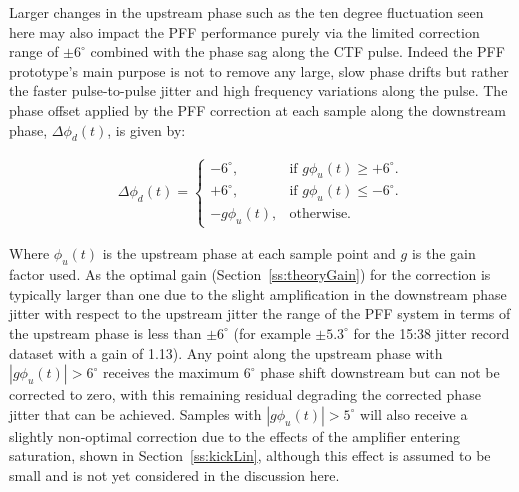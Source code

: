 Larger changes in the upstream phase such as the ten degree fluctuation seen here may 
also impact the PFF performance purely via the limited correction range of 
\(\pm6^\circ\) combined with the phase sag along the CTF pulse. Indeed the PFF 
prototype's main purpose is not to remove any large, slow phase drifts but rather the 
faster pulse-to-pulse jitter and high frequency variations along the pulse. The phase 
offset applied by the PFF correction at each sample along the downstream phase, 
\(\Delta\phi_d(t)\), is given by:


\begin{eqnarray}
	\Delta\phi_d(t) = \begin{cases}
	-6^\circ, &  \text{if $g\phi_u(t) \geq+6^\circ$.}\\
	+6^\circ, &  \text{if $g\phi_u(t)\leq-6^\circ$}.\\
	-g\phi_u(t), &  \text{otherwise.}
	\end{cases}
	\label{e:limCorrection}
\end{eqnarray}

Where \(\phi_u(t)\) is the upstream phase at each sample point and \(g\) is the gain 
factor used. As the optimal gain (Section~\ref{ss:theoryGain}) for the correction is 
typically larger than one due to the slight amplification in the downstream phase jitter 
with respect to the upstream jitter the range of the PFF system in terms of the upstream 
phase is less than \(\pm6^\circ\) (for example \(\pm5.3^\circ\) for the 15:38 jitter 
record dataset with a gain of 1.13). Any point along the upstream phase with 
\(|g\phi_u(t)| > 6^\circ\) receives the maximum \(6^\circ\) phase shift downstream but 
can not be corrected to zero, with this remaining residual degrading the corrected 
phase jitter that can be achieved. Samples with  \(|g\phi_u(t)| > 5^\circ\) will also receive 
a slightly non-optimal correction due to the effects of the amplifier entering 
saturation, shown in Section~\ref{ss:kickLin}, although this effect is assumed to be 
small and is not yet considered in the discussion here. 


